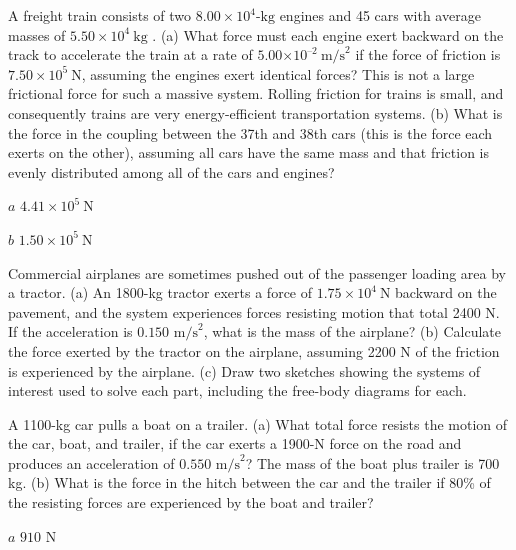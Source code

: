 \documentclass[
]{book}
\begin{document}
\hypertarget{fs-id666647}{}
\leavevmode{}%
A freight train consists of two \(8.00 \times 10^{4}\text{-kg}\) engines
and 45 cars with average masses of \(5.50 \times 10^{4}\ \text{kg}\) . (a)
What force must each engine exert backward on the track to accelerate
the train at a rate of
\({5.00{\times \text{10}^{\text{–2}}}\ \text{m/s}^{2}}{}\) if the force of
friction is \({7\text{.}{\text{50} \times \text{10}^{5}}\ \text{N}}{}\),
assuming the engines exert identical forces? This is not a large
frictional force for such a massive system. Rolling friction for trains
is small, and consequently trains are very energy-efficient
transportation systems. (b) What is the force in the coupling between
the 37th and 38th cars (this is the force each exerts on the other),
assuming all cars have the same mass and that friction is evenly
distributed among all of the cars and engines?

\leavevmode{}%
\(a\) \({4\text{.}{\text{41} \times \text{10}^{5}}\ \text{N}}{}\)

\(b\) \({1\text{.}{\text{50} \times \text{10}^{5}}\ \text{N}}{}\)

\hypertarget{fs-id1662012}{}
\leavevmode{}%
Commercial airplanes are sometimes pushed out of the passenger loading
area by a tractor. (a) An 1800-kg tractor exerts a force of
\({1\text{.}{\text{75} \times \text{10}^{4}}\ \text{N}}{}\) backward on
the pavement, and the system experiences forces resisting motion that
total 2400 N. If the acceleration is \({0\text{.}\text{150\ m/s}^{2}}{}\),
what is the mass of the airplane? (b) Calculate the force exerted by the
tractor on the airplane, assuming 2200 N of the friction is experienced
by the airplane. (c) Draw two sketches showing the systems of interest
used to solve each part, including the free-body diagrams for each.

\hypertarget{fs-id1673888}{}
\leavevmode{}%
A 1100-kg car pulls a boat on a trailer. (a) What total force resists
the motion of the car, boat, and trailer, if the car exerts a 1900-N
force on the road and produces an acceleration of
\({0\text{.}\text{550\ m/s}^{2}}{}\)? The mass of the boat plus trailer is
700 kg. (b) What is the force in the hitch between the car and the
trailer if 80\% of the resisting forces are experienced by the boat and
trailer?

\leavevmode{}%
\(a\) \(\text{910\ N}{}\)
\end{document}
